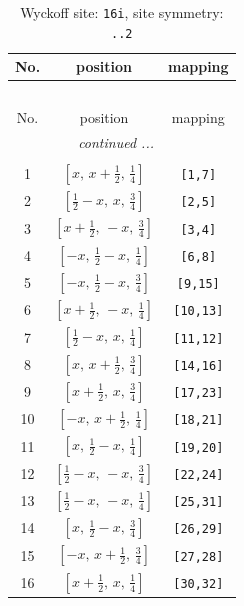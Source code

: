\documentclass[fleqn,8pt]{jsarticle}
\begin{document}
\begin{longtable}{ccc}
\caption{Wyckoff site: {\tt 16i}, site symmetry: {\tt ..2}}
 \\
 \hline \hline
No. & position & mapping \\ \hline \endfirsthead

\multicolumn{2}{l}{\tablename\ \thetable{}} \\
 \hline \hline
No. & position & mapping \\ \hline \endhead

 \hline \hline
\multicolumn{2}{r}{\footnotesize\it continued ...} \\ \endfoot

 \hline \hline
\multicolumn{2}{r}{} \\ \endlastfoot

1 & $\left[ x,\, x + \frac{1}{2},\, \frac{1}{4} \right]$ & {\tt [1,7]} \\ \hline
2 & $\left[ \frac{1}{2} - x,\, x,\, \frac{3}{4} \right]$ & {\tt [2,5]} \\ \hline
3 & $\left[ x + \frac{1}{2},\, - x,\, \frac{3}{4} \right]$ & {\tt [3,4]} \\ \hline
4 & $\left[ - x,\, \frac{1}{2} - x,\, \frac{1}{4} \right]$ & {\tt [6,8]} \\ \hline
5 & $\left[ - x,\, \frac{1}{2} - x,\, \frac{3}{4} \right]$ & {\tt [9,15]} \\ \hline
6 & $\left[ x + \frac{1}{2},\, - x,\, \frac{1}{4} \right]$ & {\tt [10,13]} \\ \hline
7 & $\left[ \frac{1}{2} - x,\, x,\, \frac{1}{4} \right]$ & {\tt [11,12]} \\ \hline
8 & $\left[ x,\, x + \frac{1}{2},\, \frac{3}{4} \right]$ & {\tt [14,16]} \\ \hline
9 & $\left[ x + \frac{1}{2},\, x,\, \frac{3}{4} \right]$ & {\tt [17,23]} \\ \hline
10 & $\left[ - x,\, x + \frac{1}{2},\, \frac{1}{4} \right]$ & {\tt [18,21]} \\ \hline
11 & $\left[ x,\, \frac{1}{2} - x,\, \frac{1}{4} \right]$ & {\tt [19,20]} \\ \hline
12 & $\left[ \frac{1}{2} - x,\, - x,\, \frac{3}{4} \right]$ & {\tt [22,24]} \\ \hline
13 & $\left[ \frac{1}{2} - x,\, - x,\, \frac{1}{4} \right]$ & {\tt [25,31]} \\ \hline
14 & $\left[ x,\, \frac{1}{2} - x,\, \frac{3}{4} \right]$ & {\tt [26,29]} \\ \hline
15 & $\left[ - x,\, x + \frac{1}{2},\, \frac{3}{4} \right]$ & {\tt [27,28]} \\ \hline
16 & $\left[ x + \frac{1}{2},\, x,\, \frac{1}{4} \right]$ & {\tt [30,32]} \\
\end{longtable}
\end{document}
